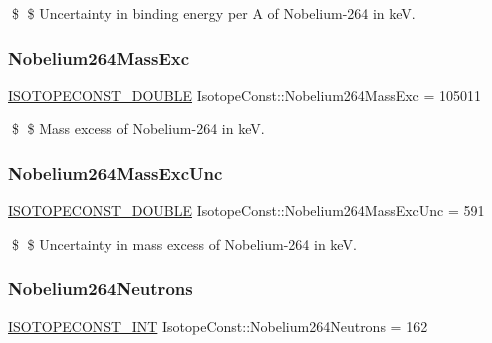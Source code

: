 \$ \$ Uncertainty in binding energy per A of Nobelium-\/264 in keV. \mbox{\label{group___isotope_const-_nobelium-_no264_ga0cd22ec4508ef627a46456725b302342}} 
\subsubsection{\texorpdfstring{Nobelium264\+Mass\+Exc}{Nobelium264MassExc}}
{\footnotesize\ttfamily \mbox{\hyperlink{group___isotope_const-_macros_ga8f45a7272ce02c0b4c65c44636ed719a}{I\+S\+O\+T\+O\+P\+E\+C\+O\+N\+S\+T\+\_\+\+D\+O\+U\+B\+LE}} Isotope\+Const\+::\+Nobelium264\+Mass\+Exc = 105011}

\$ \$ Mass excess of Nobelium-\/264 in keV. \mbox{\label{group___isotope_const-_nobelium-_no264_ga18f96949c7cb14d86abf79b2e4c9671d}} 
\subsubsection{\texorpdfstring{Nobelium264\+Mass\+Exc\+Unc}{Nobelium264MassExcUnc}}
{\footnotesize\ttfamily \mbox{\hyperlink{group___isotope_const-_macros_ga8f45a7272ce02c0b4c65c44636ed719a}{I\+S\+O\+T\+O\+P\+E\+C\+O\+N\+S\+T\+\_\+\+D\+O\+U\+B\+LE}} Isotope\+Const\+::\+Nobelium264\+Mass\+Exc\+Unc = 591}

\$ \$ Uncertainty in mass excess of Nobelium-\/264 in keV. \mbox{\label{group___isotope_const-_nobelium-_no264_ga11c3a1a8c12378c2d757b85809036a97}} 
\subsubsection{\texorpdfstring{Nobelium264\+Neutrons}{Nobelium264Neutrons}}
{\footnotesize\ttfamily \mbox{\hyperlink{group___isotope_const-_macros_ga5f18360b3e99483a35c32d789e62621c}{I\+S\+O\+T\+O\+P\+E\+C\+O\+N\+S\+T\+\_\+\+I\+NT}} Isotope\+Const\+::\+Nobelium264\+Neutrons = 162}

